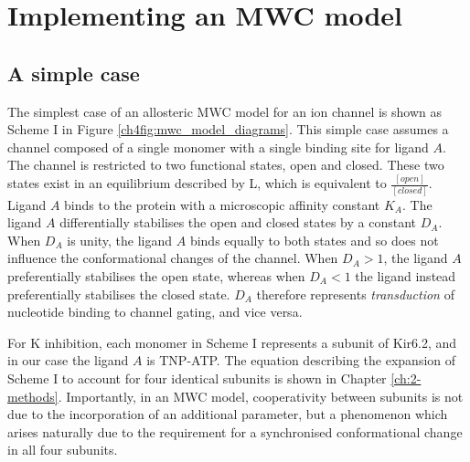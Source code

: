 \section{Implementing an MWC model}

\subsection{A simple case}

The simplest case of an allosteric MWC model for an ion channel is shown as Scheme I in Figure \ref{ch4fig:mwc_model_diagrams}.
This simple case assumes a channel composed of a single monomer with a single binding site for ligand $A$.
The channel is restricted to two functional states, open and closed.
These two states exist in an equilibrium described by L, which is equivalent to $\frac{[open]}{[closed]}$.
Ligand $A$ binds to the protein with a microscopic affinity constant $K_A$.
The ligand $A$ differentially stabilises the open and closed states by a constant $D_A$.
When $D_A$ is unity, the ligand $A$ binds equally to both states and so does not influence the conformational changes of the channel.
When $D_A>1$, the ligand $A$ preferentially stabilises the open state, whereas when $D_A<1$ the ligand instead preferentially stabilises the closed state.
$D_A$ therefore represents \textit{transduction} of nucleotide binding to channel gating, and vice versa.

For K\ATP{} inhibition, each monomer in Scheme I represents a subunit of Kir6.2, and in our case the ligand $A$ is TNP-ATP.
The equation describing the expansion of Scheme I to account for four identical subunits is shown in Chapter \ref{ch:2-methods}.
Importantly, in an MWC model, cooperativity between subunits is not due to the incorporation of an additional parameter, but a phenomenon which arises naturally due to the requirement for a synchronised conformational change in all four subunits.

